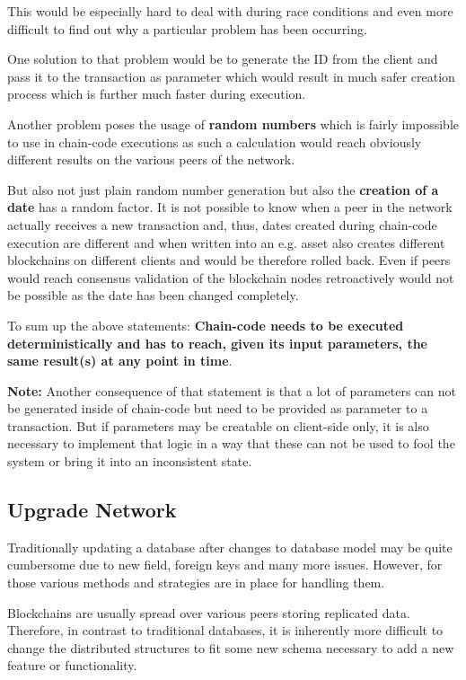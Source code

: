 This would be especially hard to deal with during race conditions and even more difficult to find out why a particular problem has been occurring.

One solution to that problem would be to generate the ID from the client and pass it to the transaction as parameter which would result in much safer creation process which is further much faster during execution.

Another problem poses the usage of \textbf{random numbers} which is fairly impossible to use in chain-code executions as such a calculation would reach obviously different results on the various peers of the network.

But also not just plain random number generation but also the \textbf{creation of a date} has a random factor. It is not possible to know when a peer in the network actually receives a new transaction and, thus, dates created during chain-code execution are different and when written into an e.g. asset also creates different blockchains on different clients and would be therefore rolled back. Even if peers would reach consensus validation of the blockchain nodes retroactively would not be possible as the date has been changed completely.

To sum up the above statements: \textbf{Chain-code needs to be executed deterministically and has to reach, given its input parameters, the same result(s) at any point in time}.

\textbf{Note:} Another consequence of that statement is that a lot of parameters can not be generated inside of chain-code but need to be provided as parameter to a transaction. But if parameters may be creatable on client-side only, it is also necessary to implement that logic in a way that these can not be used to fool the system or bring it into an inconsistent state.

\subsection{Upgrade Network}

Traditionally updating a database after changes to database model may be quite cumbersome due to new field, foreign keys and many more issues. However, for those various methods and strategies are in place for handling them.

Blockchains are usually spread over various peers storing replicated data. Therefore, in contrast to traditional databases, it is inherently more difficult to change the distributed structures to fit some new schema necessary to add a new feature or functionality.

